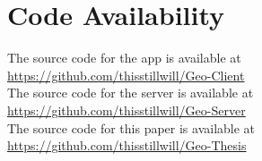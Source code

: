 \section*{Code Availability}

The source code for the app is available at\\\url{https://github.com/thisstillwill/Geo-Client}\\
The source code for the server is available at\\\url{https://github.com/thisstillwill/Geo-Server}\\
The source code for this paper is available at\\\url{https://github.com/thisstillwill/Geo-Thesis}\\
